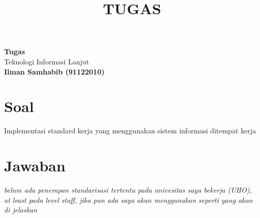 \documentclass[12pt]{article}
\title{TUGAS }
\begin{document}

\begin{center}
    \textbf{Tugas}\\
    Teknologi Informasi Lanjut\\
  \textbf{Ilman Samhabib (91122010)}\\
\end{center}
\section*{Soal}
Implementasi standard kerja yang menggunakan sistem informasi ditempat kerja 
\section*{Jawaban}
\emph{belum ada penerapan standarisasi tertentu pada univesitas saya bekerja (UHO), at least pada level staff, jika pun ada saya akan menggunakan seperti yang akan di jelaskan}
\end{document}
